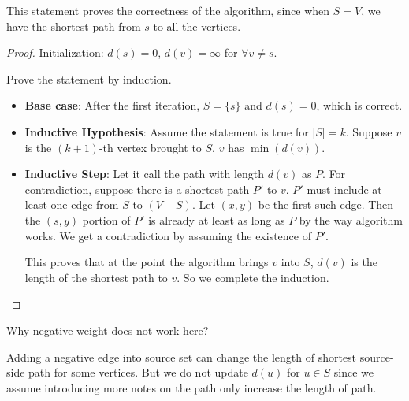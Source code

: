 This statement proves the correctness of the algorithm, since when $S = V$, we have the shortest path from $s$ to all the vertices.

\begin{proof}
	Initialization: $d(s) = 0$, $d(v) = \infty$ for $\forall v \neq s$.
	
	Prove the statement by induction.
	\begin{itemize}
		\item \textbf{Base case}: After the first iteration, $S = \{s\}$ and $d(s) = 0$, which is correct.
		\item \textbf{Inductive Hypothesis}: Assume the statement is true for $|S| = k$. Suppose $v$ is the $(k+1)$-th vertex brought to $S$. $v$ has $\min(d(v))$.
		\item \textbf{Inductive Step}: Let it call the path with length $d(v)$ as $P$. For contradiction, suppose there is a shortest path $P'$ to $v$. $P'$ must include at least one edge from $S$ to $(V-S)$. Let $(x, y)$ be the first such edge. Then the $(s, y)$ portion of $P'$ is already at least as long as $P$ by the way algorithm works. We get a contradiction by assuming the existence of $P'$.
		
		This proves that at the point the algorithm brings $v$ into $S$, $d(v)$ is the length of the shortest path to $v$. So we complete the induction.
	\end{itemize}
\end{proof}

Why negative weight does not work here?

Adding a negative edge into source set can change the length of shortest source-side path for some vertices. But we do not update $d(u)$ for $u \in S$ since we assume introducing more notes on the path only increase the length of path.
